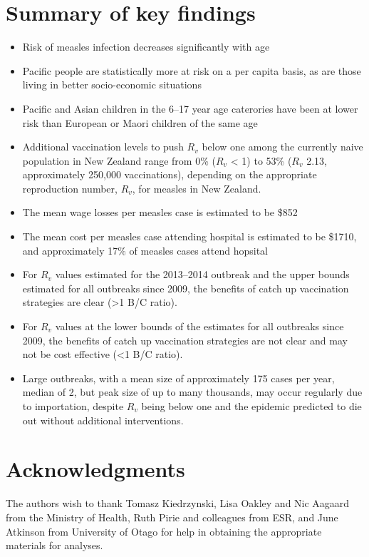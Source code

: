 \documentclass{article}
\begin{document}
\section {Summary of key findings}
\begin{itemize}
\item Risk of measles infection decreases significantly with age
\item Pacific people are statistically more at risk on a per capita basis, as are those living in better socio-economic situations
\item Pacific and Asian children in the 6--17 year age caterories have been at lower risk than European or Maori children of the same age
\item Additional vaccination levels to push $R_v$ below one among the currently naive population in New Zealand range from 0\% ($R_v$ < 1) to 53\% ($R_v$ 2.13, approximately 250,000 vaccinations), depending on the appropriate reproduction number, $R_v$, for measles in New Zealand.
\item The mean wage losses per measles case is estimated to be \$852
\item The mean cost per measles case attending hospital is estimated to be \$1710, and approximately 17\% of measles cases attend hopsital
\item For $R_v$ values estimated for the 2013--2014 outbreak and the upper bounds estimated for all outbreaks since 2009, the benefits of catch up vaccination strategies are clear (>1 B/C ratio).
\item For $R_v$ values at the lower bounds of the estimates for all outbreaks since 2009, the benefits of catch up vaccination strategies are not clear and may not be cost effective (<1 B/C ratio).
\item Large outbreaks, with a mean size of approximately 175 cases per year, median of 2, but peak size of up to many thousands, may occur regularly due to importation, despite $R_v$ being below one and the epidemic predicted to die out without additional interventions.
\end{itemize}

\section{Acknowledgments}
The authors wish to thank Tomasz Kiedrzynski, Lisa Oakley and Nic Aagaard from the Ministry of Health, Ruth Pirie and colleagues from ESR, and June Atkinson from University of Otago for help in obtaining the appropriate materials for analyses.
\end{document}

